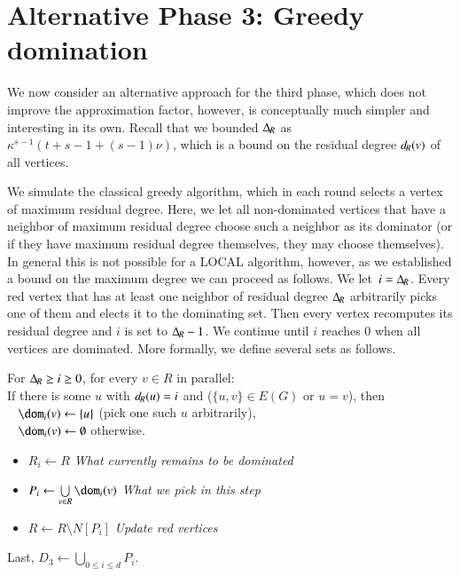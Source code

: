 
\section{Alternative Phase 3: Greedy domination}\label{sec:greedy-be}

We now consider an alternative approach for the third phase, which does
not improve the approximation factor, however, is conceptually much
simpler and interesting in its own. Recall that we bounded
$\Delta_{\hspace{-1pt}R}$ as $\kappa^{s-1}(t+s-1+(s-1)\nu)$, which is a bound on the residual
degree $d_{\hspace{-1pt}R}(v)$ of all vertices.

\newcommand{\dR}{\Dr}
\newcommand{\ddR}{\dr}
\newcommand{\pick}{P}

We simulate the classical greedy algorithm, which in each
round selects a vertex of maximum residual degree. Here, we let all
non-dominated vertices that have a neighbor of maximum residual degree
choose such a neighbor as its dominator (or if they have maximum
residual degree themselves, they may choose themselves). In general
this is not possible for a LOCAL algorithm, however, as we established
a bound on the maximum degree we can proceed as follows. We
let~$i={\dR}$. Every red vertex that has at least one neighbor of residual
degree ${\dR}$ arbitrarily picks one of them and elects it to the
dominating set. Then every vertex recomputes its residual degree and
$i$ is set to ${\dR}-1$. We continue until $i$ reaches $0$ when all
vertices are dominated. More formally, we define several sets as
follows.

\smallskip
\begin{tcolorbox}[colback=red!5!white,colframe=red!50!black]
  For ${\dR}\geq i\geq 0$,  for every $v\in R$ in parallel:\\[2mm]
  If there is some $u$ with ${\ddR}(u)=i$ and ($\{u,v\}\in E(G)$ or $u=v$), then\\
  \mbox{ } $\dom_i(v)\leftarrow \{u\}$ (pick one such $u$ arbitrarily),\\
  \mbox{ } $\dom_i(v)\leftarrow \emptyset$ otherwise.
  \begin{itemize}
    \item $R_i \leftarrow R$ \hfill \textit{\small What currently remains to be dominated}
    \item $\pick_i \leftarrow \bigcup\limits_{v\in R} \dom_i(v)$ \hfill \textit{\small What we pick in this step}
    \item $R \leftarrow R \setminus N[\pick_{i}]$ \hfill \textit{\small Update red vertices}
  \end{itemize}
  Last, $D_3\leftarrow  \bigcup\limits_{0\le i\le d} \pick_i$.
\end{tcolorbox}

